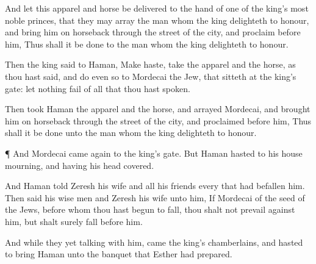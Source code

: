 {And let this
apparel and
horse be
delivered to the
hand of
one of the
king’s most
noble
princes, that they may
array the
man
{} whom the
king
delighteth to
honour, and
bring him on
horseback through the
street of the
city, and
proclaim
before him, Thus shall it be
done to the
man whom the
king
delighteth to
honour.

Then the
king
said to
Haman, Make
haste,
{}
take the
apparel and the
horse, as thou hast
said, and
do even so to
Mordecai the
Jew, that
sitteth at the
king’s
gate: let
nothing
fail of all that thou hast
spoken.

Then
took
Haman the
apparel and the
horse, and
arrayed
Mordecai, and brought him on
horseback through the
street of the
city, and
proclaimed
before him, Thus shall it be
done unto the
man whom the
king
delighteth to
honour.


\par }{\PP {}¶ And
Mordecai came
again to the
king’s
gate. But
Haman
hasted to his
house
mourning, and having his
head
covered.

And
Haman
told
Zeresh his
wife and all his
friends every
{} that had
befallen him. Then
said his wise
men and
Zeresh his
wife unto him, If
Mordecai
{} of the
seed of the
Jews,
before whom thou hast
begun to
fall, thou shalt not
prevail against him, but shalt
surely
fall
before him.

And while they
{} yet
talking with him,
came the
king’s
chamberlains, and
hasted to
bring
Haman unto the
banquet that
Esther had
prepared.




\par }
